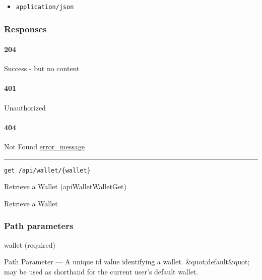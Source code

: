 \begin{itemize}
\tightlist
\item
  \texttt{application/json}
\end{itemize}

\hypertarget{responses-187}{%
\subsubsection{Responses}\label{responses-187}}

\hypertarget{section-602}{%
\paragraph{204}\label{section-602}}

Success - but no content \protect\hyperlink{}{}

\hypertarget{section-603}{%
\paragraph{401}\label{section-603}}

Unauthorized \protect\hyperlink{}{}

\hypertarget{section-604}{%
\paragraph{404}\label{section-604}}

Not Found \protect\hyperlink{error_message}{error\_message}

\begin{center}\rule{0.5\linewidth}{\linethickness}\end{center}

\protect\hypertarget{apiWalletWalletGet}{}{}

\begin{verbatim}
get /api/wallet/{wallet}
\end{verbatim}

Retrieve a Wallet ({apiWalletWalletGet})

Retrieve a Wallet

\hypertarget{path-parameters-103}{%
\subsubsection{Path parameters}\label{path-parameters-103}}

wallet (required)

{Path Parameter} --- A unique id value identifying a wallet.
\&quot;default\&quot; may be used as shorthand for the current user's
default wallet.

